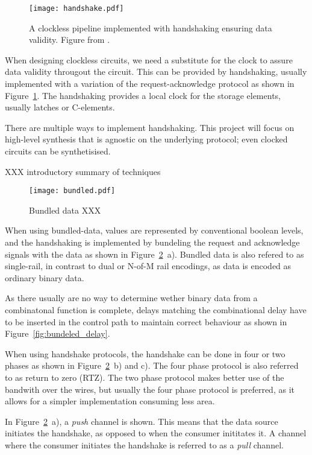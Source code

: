\begin{figure}[htbp]
  \centering
  \texttt{[image: handshake.pdf]}
  \caption{A clockless pipeline implemented with handshaking ensuring
    data validity. Figure from \cite{sparso}.}
  \label{fig:handshake}
\end{figure}

When designing clockless circuits, we need a substitute for the clock
to assure data validity througout the circuit. This can be provided by
handshaking, usually implemented with a variation of the
request-acknowledge protocol as shown in
Figure~\ref{fig:handshake}. The handshaking provides a local clock for
the storage elements, usually latches or C-elements.

There are multiple ways to implement handshaking. This project will
focus on high-level synthesis that is agnostic on the underlying
protocol; even clocked circuits can be synthetisised. 

XXX introductory summary of techniques

\begin{figure}[htbp]
  \centering
  \texttt{[image: bundled.pdf]}
  \caption{Bundled data XXX}
  \label{fig:bundled}
\end{figure}

When using bundled-data, values are represented by conventional
boolean levels, and the handshaking is implemented by bundeling the
request and acknowledge signals with the data as shown in
Figure~\ref{fig:bundled}~a). Bundled data is also refered to as
single-rail, in contrast to dual or N-of-M rail encodings, as data is
encoded as ordinary binary data.

As there usually are no way to determine wether binary data from a
combinatonal function is complete, delays matching the combinational
delay have to be inserted in the control path to maintain correct
behaviour as shown in Figure~\ref{fig:bundeled_delay}.

When using handshake protocols, the handshake can be done in four or
two phases as shown in Figure~\ref{fig:bundled}~b) and c). The four
phase protocol is also referred to as return to zero (RTZ). The two
phase protocol makes better use of the bandwith over the wires, but
usually the four phase protocol is preferred, as it allows for a
simpler implementation consuming less area.

In Figure~\ref{fig:bundled}~a), a \emph{push} channel is shown. This means
that the data source initiates the handshake, as opposed to when the
consumer inititates it. A channel where the consumer initiates the
handshake is referred to as a \emph{pull} channel.


